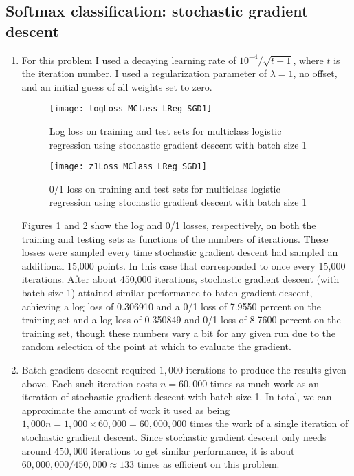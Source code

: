 \documentclass{article}
\begin{document}
\subsection{Softmax classification: stochastic gradient descent}
\begin{enumerate}
	\item For this problem I used a decaying learning rate of $10^{-4} / \sqrt{t+1}$, where $t$ is the iteration number. I used a regularization parameter of $\lambda=1$, no offset, and an initial guess of all weights set to zero.
	\begin{figure}
        \centering
        \texttt{[image: logLoss\_MClass\_LReg\_SGD1]}
        \caption{Log loss on training and test sets for multiclass logistic regression using stochastic gradient descent with batch size 1} 
        \label{fig:2.3.1log}
    \end{figure}
    \begin{figure}
        \centering
        \texttt{[image: z1Loss\_MClass\_LReg\_SGD1]}
        \caption{0/1 loss on training and test sets for multiclass logistic regression using stochastic gradient descent with batch size 1} 
        \label{fig:2.3.1z1}
    \end{figure}

    Figures \ref{fig:2.3.1log} and \ref{fig:2.3.1z1} show the log and 0/1 losses, respectively, on both the training and testing sets as functions of the numbers of iterations. These losses were sampled every time stochastic gradient descent had sampled an additional 15,000 points. In this case that corresponded to once every 15,000 iterations. After about 450,000 iterations, stochastic gradient descent (with batch size 1) attained similar performance to batch gradient descent, achieving a log loss of 0.306910 and a 0/1 loss of 7.9550 percent on the training set and a log loss of 0.350849 and 0/1 loss of 8.7600 percent on the training set, though these numbers vary a bit for any given run due to the random selection of the point at which to evaluate the gradient.


	\item Batch gradient descent required $1,000$ iterations to produce the results given above. Each such iteration costs $n=60,000$ times as much work as an iteration of stochastic gradient descent with batch size 1. In total, we can approximate the amount of work it used as being $1,000n = 1,000\times 60,000 = 60,000,000$ times the work of a single iteration of stochastic gradient descent. Since stochastic gradient descent only needs around $450,000$ iterations to get similar performance, it is about $60,000,000 / 450,000 \approx 133$ times as efficient on this problem.


\end{enumerate}
\end{document}
